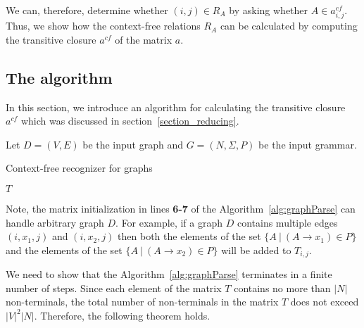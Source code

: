We can, therefore, determine whether $(i,j) \in R_A$ by asking whether $A \in a^{cf}_{i,j}$. Thus, we show how the context-free relations $R_A$ can be calculated by computing the transitive closure $a^{cf}$ of the matrix $a$.



\subsection{The algorithm} \label{section_algorithm}
In this section, we introduce an algorithm for calculating the transitive closure $a^{cf}$ which was discussed in section~\ref{section_reducing}.

Let $D = (V, E)$ be the input graph and $G = (N,\Sigma,P)$ be the input grammar.

\begin{algorithm}[H]
\begin{algorithmic}[1]
\caption{Context-free recognizer for graphs}
\label{alg:graphParse}
    
    \EndFor    
       
    \EndWhile
\State \Return $T$
\EndFunction
\end{algorithmic}
\end{algorithm}

Note, the matrix initialization in lines \textbf{6-7} of the Algorithm~\ref{alg:graphParse} can handle arbitrary graph $D$. For example, if a graph $D$ contains multiple edges $(i,x_1,j)$ and $(i,x_2,j)$ then both the elements of the set $\{A~|~(A \rightarrow x_1) \in P \}$ and the elements of the set $\{A~|~(A \rightarrow x_2) \in P \}$ will be added to $T_{i,j}$.

We need to show that the Algorithm~\ref{alg:graphParse} terminates in a finite number of steps. Since each element of the matrix $T$ contains no more than $|N|$ non-terminals, the total number of non-terminals in the matrix $T$ does not exceed $|V|^2|N|$. Therefore, the following theorem holds.

